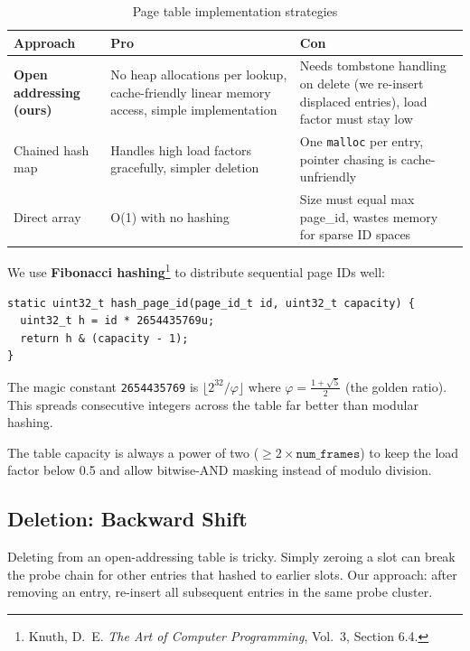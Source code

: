 \documentclass[12pt, a4paper]{report}
\begin{document}
\begin{table}[h]
\centering
\begin{tabularx}{\textwidth}{lXX}
\toprule
\textbf{Approach} & \textbf{Pro} & \textbf{Con} \\
\midrule
\textbf{Open addressing (ours)} &
    No heap allocations per lookup, cache-friendly linear memory access,
    simple implementation &
    Needs tombstone handling on delete (we re-insert displaced entries),
    load factor must stay low \\
\addlinespace
Chained hash map &
    Handles high load factors gracefully, simpler deletion &
    One \texttt{malloc} per entry, pointer chasing is cache-unfriendly \\
\addlinespace
Direct array &
    O(1) with no hashing &
    Size must equal max page\_id, wastes memory for sparse ID spaces \\
\bottomrule
\end{tabularx}
\caption{Page table implementation strategies}
\end{table}

We use \textbf{Fibonacci hashing}\footnote{Knuth, D.~E.
\textit{The Art of Computer Programming}, Vol.~3, Section 6.4.} to
distribute sequential page IDs well:

\begin{lstlisting}
static uint32_t hash_page_id(page_id_t id, uint32_t capacity) {
  uint32_t h = id * 2654435769u;
  return h & (capacity - 1);
}
\end{lstlisting}

The magic constant \texttt{2654435769} is $\lfloor 2^{32} / \varphi \rfloor$
where $\varphi = \frac{1+\sqrt{5}}{2}$ (the golden ratio). This spreads
consecutive integers across the table far better than modular hashing.

The table capacity is always a power of two ($\geq 2 \times
\texttt{num\_frames}$) to keep the load factor below 0.5 and allow
bitwise-AND masking instead of modulo division.

\subsection{Deletion: Backward Shift}

Deleting from an open-addressing table is tricky. Simply zeroing a slot
can break the probe chain for other entries that hashed to earlier slots.
Our approach: after removing an entry, re-insert all subsequent entries in
the same probe cluster.
\end{document}
